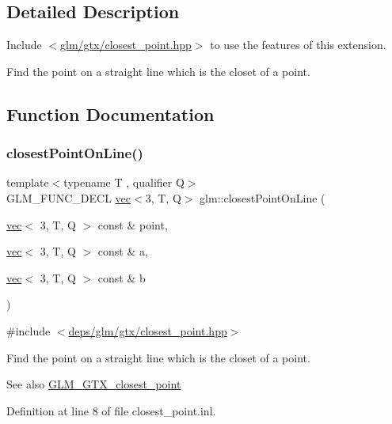 \subsection{Detailed Description}
Include $<$\hyperlink{closest__point_8hpp}{glm/gtx/closest\+\_\+point.\+hpp}$>$ to use the features of this extension.

Find the point on a straight line which is the closet of a point. 

\subsection{Function Documentation}
\mbox{\label{group__gtx__closest__point_ga36529c278ef716986151d58d151d697d}} 
\subsubsection{\texorpdfstring{closest\+Point\+On\+Line()}{closestPointOnLine()}}
{\footnotesize\ttfamily template$<$typename T , qualifier Q$>$ \\
G\+L\+M\+\_\+\+F\+U\+N\+C\+\_\+\+D\+E\+CL \hyperlink{structglm_1_1vec}{vec}$<$3, T, Q$>$ glm\+::closest\+Point\+On\+Line (\begin{DoxyParamCaption}\item[{\hyperlink{structglm_1_1vec}{vec}$<$ 3, T, Q $>$ const \&}]{point,  }\item[{\hyperlink{structglm_1_1vec}{vec}$<$ 3, T, Q $>$ const \&}]{a,  }\item[{\hyperlink{structglm_1_1vec}{vec}$<$ 3, T, Q $>$ const \&}]{b }\end{DoxyParamCaption})}



{\ttfamily \#include $<$\hyperlink{closest__point_8hpp}{deps/glm/gtx/closest\+\_\+point.\+hpp}$>$}

Find the point on a straight line which is the closet of a point. \begin{DoxySeeAlso}{See also}
\hyperlink{group__gtx__closest__point}{G\+L\+M\+\_\+\+G\+T\+X\+\_\+closest\+\_\+point} 
\end{DoxySeeAlso}


Definition at line 8 of file closest\+\_\+point.\+inl.

